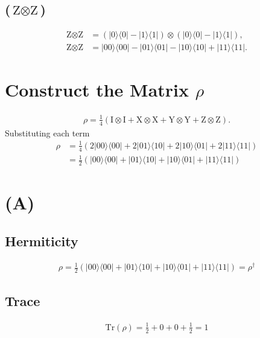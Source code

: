 \documentclass{article}
\newcommand{\op}[2]{|#1\rangle \langle#2|}
\begin{document}
\subsection*{($\text{Z} \otimes \text{Z}$)}
\begin{align*}
\text{Z} \otimes \text{Z} &= (\op{0}{0} - \op{1}{1}) \otimes (\op{0}{0} - \op{1}{1}), \\
\text{Z} \otimes \text{Z} &= \op{00}{00} - \op{01}{01} - \op{10}{10} + \op{11}{11}.
\end{align*}

\section*{Construct the Matrix $\rho$}
\begin{align*}
\rho = \frac{1}{4} \left( \text{I} \otimes \text{I} + \text{X} \otimes \text{X} + \text{Y} \otimes \text{Y} + \text{Z} \otimes \text{Z} \right).
\end{align*}
Substituting each term
\begin{align*}
\rho &= \frac{1}{4} \left( 2\op{00}{00} + 2\op{01}{10} + 2\op{10}{01} + 2\op{11}{11} \right) \\
     &= \frac{1}{2} \left( \op{00}{00} + \op{01}{10} + \op{10}{01} + \op{11}{11} \right)
\end{align*}

\section*{(A)}

\subsection*{Hermiticity}
\begin{align*}
    \rho = \frac{1}{2} \left( \op{00}{00} + \op{01}{10} + \op{10}{01} + \op{11}{11} \right) = \rho^\dagger
\end{align*}
\subsection*{Trace}
\begin{align*}
\text{Tr}(\rho) = \frac{1}{2} + 0 + 0 + \frac{1}{2}  = 1
\end{align*}
\end{document}
